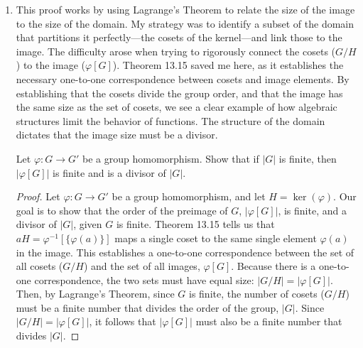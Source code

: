 \documentclass[12pt, oneside]{book}
\newcommand{\pf}[1]{
    \begin{customframedproof}[linecolor=horange!75]
        \begin{proof}
        #1
        \end{proof}
    \end{customframedproof}
}
\begin{document}
\begin{enumerate}[label=\textbf{\arabic*.}]
    \item 
    
    
    This proof works by using Lagrange's Theorem to relate the size of the image to the size of the domain. My strategy was to identify a subset of the domain that partitions it perfectly—the cosets of the kernel—and link those to the image. The difficulty arose when trying to rigorously connect the cosets (\(G/H\)) to the image (\(\varphi[G]\)). Theorem 13.15 saved me here, as it establishes the necessary one-to-one correspondence between cosets and image elements. By establishing that the cosets divide the group order, and that the image has the same size as the set of cosets, we see a clear example of how algebraic structures limit the behavior of functions. The structure of the domain dictates that the image size must be a divisor. 

    Let \(\varphi : G \to G'\) be a group homomorphism. Show that if \(|G|\) is finite, then \(|\varphi[G]|\) is finite and is a divisor of \(|G|\).
    \pf{
        Let \(\varphi : G \to G'\) be a group homomorphism, and let \(H = \ker(\varphi)\). Our goal is to show that the order of the preimage of \(G\), \(|\varphi[G]|\), is finite, and a divisor of \(|G|\), given \(G\) is finite. Theorem 13.15 tells us that \(aH = \varphi^{-1}[\{\varphi(a)\}]\) maps a single coset to the same single element \(\varphi(a)\) in the image. This establishes a one-to-one correspondence between the set of all cosets (\(G/H\)) and the set of all images, \(\varphi[G]\). Because there is a one-to-one correspondence, the two sets must have equal size: \(|G/H| = |\varphi[G]|\). Then, by Lagrange's Theorem, since \(G\) is finite, the number of cosets (\(G/H\)) must be a finite number that divides the order of the group, \(|G|\).  Since \(|G/H| = |\varphi[G]|\), it follows that \(|\varphi[G]|\) must also be a finite number that divides \(|G|\).
    }  


\end{enumerate}
\end{document}
